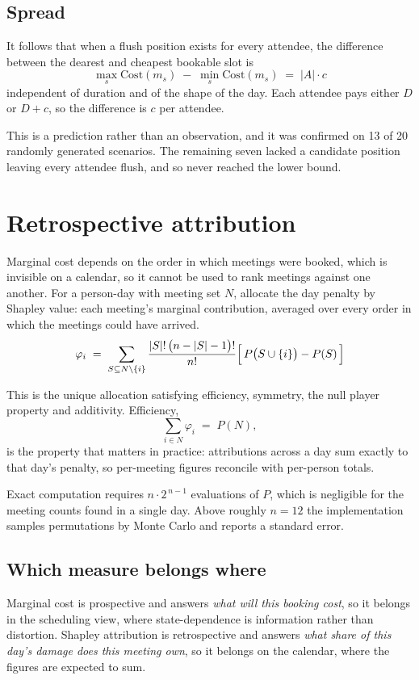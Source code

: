 \documentclass[11pt]{article}
\begin{document}
\subsection{Spread}

It follows that when a flush position exists for every attendee, the
difference between the dearest and cheapest bookable slot is
\[
\max_{s} \mathrm{Cost}(m_s) \;-\; \min_{s} \mathrm{Cost}(m_s)
\;=\; |A| \cdot c
\]
independent of duration and of the shape of the day. Each attendee pays
either $D$ or $D + c$, so the difference is $c$ per attendee.

This is a prediction rather than an observation, and it was confirmed on 13
of 20 randomly generated scenarios. The remaining seven lacked a candidate
position leaving every attendee flush, and so never reached the lower bound.

\section{Retrospective attribution}

Marginal cost depends on the order in which meetings were booked, which is
invisible on a calendar, so it cannot be used to rank meetings against one
another. For a person-day with meeting set $N$, allocate the day penalty by
Shapley value: each meeting's marginal contribution, averaged over every
order in which the meetings could have arrived.
\[
\varphi_i \;=\; \sum_{S \subseteq N \setminus \{i\}}
\frac{|S|!\,\bigl(n - |S| - 1\bigr)!}{n!}
\Bigl[\, P\bigl(S \cup \{i\}\bigr) - P(S) \,\Bigr]
\]

This is the unique allocation satisfying efficiency, symmetry, the null
player property and additivity. Efficiency,
\[
\sum_{i \in N} \varphi_i \;=\; P(N),
\]
is the property that matters in practice: attributions across a day sum
exactly to that day's penalty, so per-meeting figures reconcile with
per-person totals.

Exact computation requires $n \cdot 2^{\,n-1}$ evaluations of $P$, which is
negligible for the meeting counts found in a single day. Above roughly
$n = 12$ the implementation samples permutations by Monte Carlo and reports
a standard error.

\subsection{Which measure belongs where}

Marginal cost is prospective and answers \emph{what will this booking cost},
so it belongs in the scheduling view, where state-dependence is information
rather than distortion. Shapley attribution is retrospective and answers
\emph{what share of this day's damage does this meeting own}, so it belongs
on the calendar, where the figures are expected to sum.
\end{document}
